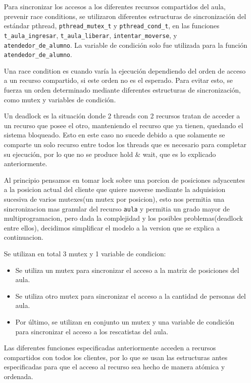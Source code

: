 Para sincronizar los accesos a los diferentes recursos compartidos del aula, prevenir race conditions, se utilizaron diferentes estructuras de sincronizaci\'on del est\'andar pthread, \verb|pthread_mutex_t| y \verb|pthread_cond_t|, en las funciones \verb|t_aula_ingresar|, \verb|t_aula_liberar|, \verb|intentar_moverse|, y \\\verb|atendedor_de_alumno|. La variable de condici\'on solo fue utilizada para la funci\'on \verb|atendedor_de_alumno|.

Una race condition es cuando var\'ia la ejecuci\'on dependiendo del orden de acceso a un recurso compartido, si este orden no es el esperado. Para evitar esto, se fuerza un orden determinado mediante diferentes estructuras de sincronizaci\'on, como mutex y variables de condici\'on.

Un deadlock es la situaci\'on donde 2 threads con 2 recursos tratan de acceder a un recurso que posee el otro, manteniendo el recurso que ya tienen, quedando el sistema bloqueado. Esto en este caso no sucede debido a que solamente se comparte un solo recurso entre todos los threads que es necesario para completar su ejecuci\'on, por lo que no se produce hold \& wait, que es lo explicado anteriormente.

Al principio pensamos en tomar lock sobre una porcion de posiciones adyacentes a la posicion actual del cliente que quiere moverse mediante la adquisision sucesiva de varios mutexes(un mutex por posicion), esto nos permitia una sincronizacion mas granular del recurso \verb|aula| y permitia un grado mayor de multiprogramacion, pero dada la complejidad y los posibles problemas(deadlock entre ellos), decidimos simplificar el modelo a la version que se explica a continuacion.

Se utilizan en total 3 mutex y 1 variable de condicion:

\begin{itemize}
\item Se utiliza un mutex para sincronizar el acceso a la matriz de posiciones del aula.
\item Se utiliza otro mutex para sincronizar el acceso a la cantidad de personas del aula.
\item Por \'ultimo, se utilizan en conjunto un mutex y una variable de condici\'on para sincronizar el acceso a los rescatistas del aula.
\end{itemize}

Las diferentes funciones especificadas anteriormente acceden a recursos compartidos con todos los clientes, por lo que se usan las estructuras antes especificadas para que el acceso al recurso sea hecho de manera at\'omica y ordenada.

